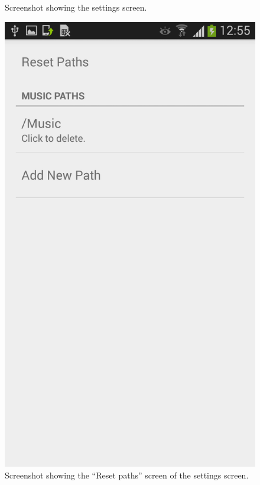 \begin{figure}
\begin{minipage}{.5\textwidth}
  \caption{Screenshot showing the \newline settings screen.}
  \label{fig:settings}
\end{minipage}%
\begin{minipage}{.5\textwidth}
\centering
    \includegraphics[scale=0.2]{Images/Screenshots/settingsPath.png}
  \caption{Screenshot showing the ``Reset paths'' screen of the settings screen.}
  \label{fig:settingsPath}
\end{minipage}
\end{figure}
